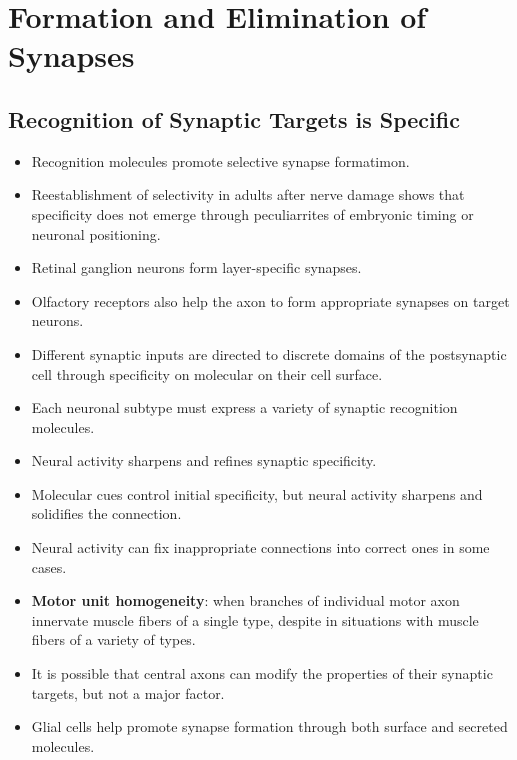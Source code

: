 \documentclass[12pt,a4paper]{article}
\begin{document}

\clearpage
\section{Formation and Elimination of Synapses}
\subsection{Recognition of Synaptic Targets is Specific}
\begin{itemize}
    \item Recognition molecules promote selective synapse formatimon.
    \item Reestablishment of selectivity in adults after nerve damage shows that specificity does not emerge through peculiarrites of embryonic timing or neuronal positioning.
    \item Retinal ganglion neurons form layer-specific synapses.
    \item Olfactory receptors also help the axon to form appropriate synapses on target neurons.
    \item Different synaptic inputs are directed to discrete domains of the postsynaptic cell through specificity on molecular on their cell surface.
    \item Each neuronal subtype must express a variety of synaptic recognition molecules.
    \item Neural activity sharpens and refines synaptic specificity.
    \item Molecular cues control initial specificity, but neural activity sharpens and solidifies the connection.
    \item Neural activity can fix inappropriate connections into correct ones in some cases.
    \item \textbf{Motor unit homogeneity}: when branches of individual motor axon innervate muscle fibers of a single type, despite in situations with muscle fibers of a variety of types.
    \item It is possible that central axons can modify the properties of their synaptic targets, but not a major factor.
    \item Glial cells help promote synapse formation through both surface and secreted molecules. 
\end{itemize}

\end{document}
